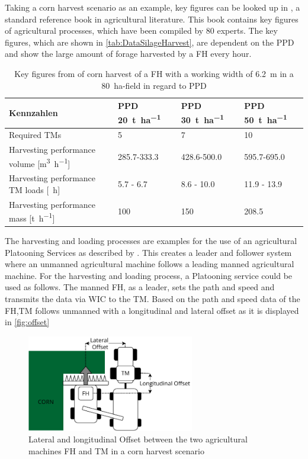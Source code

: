 \documentclass[]{nsm-thesis}
\begin{document}
Taking a corn harvest scenario as an example, key figures can be looked up in \cite{faustzahlen2018}, a standard reference book in agricultural literature. This book contains key figures of agricultural processes, which have been compiled by 80 experts. The key figures, which are shown in \autoref{tab:DataSilageHarvest}, are dependent on the \ac{PPD} and show the large amount of forage harvested by a \ac{FH} every hour.
\begin{table}
	\centering
	\begin{tabular}{>{\raggedright}p{5.5cm}p{1.6cm}p{1.6cm}p{1.6cm}}
		\toprule
		Kennzahlen & \ac{PPD} \SI{20}{\tonne\per\hectare} & \ac{PPD} \SI{30}{\tonne\per\hectare} & \ac{PPD} \SI{50}{\tonne\per\hectare}\\
		\midrule
		Required \ac{TM}s & \num{5}&
		\num{7} & \num{10} \\
		Harvesting performance volume [\si{\cubic\metre\per\hour}] &
		\num{285.7}-\num{333.3}
		& \num{428.6}-\num{500.0} &
		\num{595.7}-\num{695.0}\\
		Harvesting performance \ac{TM} loads [\si{\per\hour}] &
		\num{5.7} - \num{6.7}
		& \num{8.6} - \num{10.0} &
		\num{11.9} - \num{13.9}\\
		Harvesting performance mass [\si{\tonne\per\hour}] & \num{100}
		 & \num{150} &
		\num{208.5} \\
		\bottomrule
	\end{tabular}
	\caption{Key figures from \cite{faustzahlen2018} of corn harvest of a \ac{FH} with a working width of \SI{6.2}{\metre} in a \SI{80}{\hectare}-field in regard to \ac{PPD}}
	\label{tab:DataSilageHarvest}
\end{table}

The harvesting and loading processes are examples for the use of an agricultural Platooning Services as described by 
\textcite{zhang_method_2009}.
This creates a leader and follower system where an unmanned agricultural machine follows a leading manned agricultural machine.
For the harvesting and loading process, a Platooning service could be used as follows.
The manned \ac{FH}, as a leader, sets the path and speed and transmits the data via \ac{WIC} to the \ac{TM}. Based on the path and speed data of the \ac{FH},\ac{TM} follows unmanned with a longitudinal and lateral offset as it is displayed in \autoref{fig:offset}
\begin{figure}%
	\centering
	\includegraphics[width=0.65\textwidth]{figures/offset_platoon.pdf}
	\caption{Lateral and longitudinal Offset between the two agricultural machines \ac{FH} and \ac{TM} in a corn harvest scenario}%
	\label{fig:offset}%
\end{figure}
\end{document}
